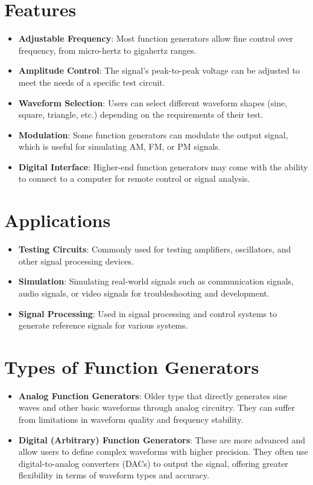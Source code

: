 \documentclass[a4paper,12pt]{article}
\begin{document}
\section*{Features}
\begin{itemize}
    \item \textbf{Adjustable Frequency}: Most function generators allow fine control over frequency, from micro-hertz to gigahertz ranges.
    \item \textbf{Amplitude Control}: The signal's peak-to-peak voltage can be adjusted to meet the needs of a specific test circuit.
    \item \textbf{Waveform Selection}: Users can select different waveform shapes (sine, square, triangle, etc.) depending on the requirements of their test.
    \item \textbf{Modulation}: Some function generators can modulate the output signal, which is useful for simulating AM, FM, or PM signals.
    \item \textbf{Digital Interface}: Higher-end function generators may come with the ability to connect to a computer for remote control or signal analysis.
\end{itemize}

\section*{Applications}
\begin{itemize}
    \item \textbf{Testing Circuits}: Commonly used for testing amplifiers, oscillators, and other signal processing devices.
    \item \textbf{Simulation}: Simulating real-world signals such as communication signals, audio signals, or video signals for troubleshooting and development.
    \item \textbf{Signal Processing}: Used in signal processing and control systems to generate reference signals for various systems.
\end{itemize}

\section*{Types of Function Generators}
\begin{itemize}
    \item \textbf{Analog Function Generators}: Older type that directly generates sine waves and other basic waveforms through analog circuitry. They can suffer from limitations in waveform quality and frequency stability.
    \item \textbf{Digital (Arbitrary) Function Generators}: These are more advanced and allow users to define complex waveforms with higher precision. They often use digital-to-analog converters (DACs) to output the signal, offering greater flexibility in terms of waveform types and accuracy.
\end{itemize}
\end{document}

